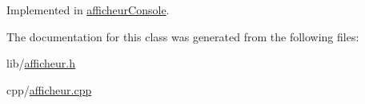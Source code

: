Implemented in \hyperlink{classafficheur_console_a0930128cabb9b2585db0140f7614a3df}{afficheur\+Console}.



The documentation for this class was generated from the following files\+:\begin{DoxyCompactItemize}
\item 
lib/\hyperlink{afficheur_8h}{afficheur.\+h}\item 
cpp/\hyperlink{afficheur_8cpp}{afficheur.\+cpp}\end{DoxyCompactItemize}
